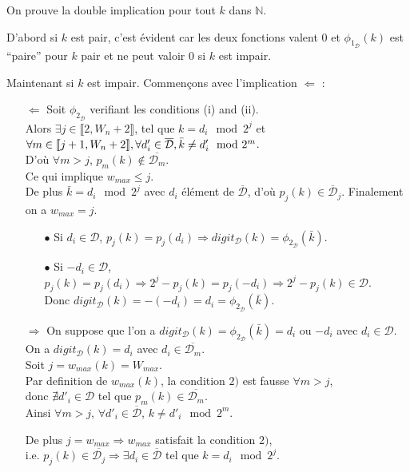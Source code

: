 \documentclass[12pt, a4paper]{memoir}
\begin{document}
\begin{Preuve}
 On prouve la double implication pour tout $k$ dans $\mathbb{N}$.
 
 D'abord si $k$ est pair, c'est évident car les deux fonctions valent $0$ et $\phi_{1_\mathcal{D}}(k)$ est ``paire'' pour $k$ pair et ne peut valoir $0$ si $k$ est impair.
 
 Maintenant si $k$ est impair. Commençons avec l'implication $\Leftarrow$ :
 \begin{itemize}
  \item [$\Leftarrow$] Soit $\phi_{2_\mathcal{D}}$ verifiant les conditions (i) and (ii). \\
  Alors $\exists j \in \llbracket 2,W_n+2 \rrbracket$,
 tel que $k = d_i \mod 2^j$ et $\forall m \in \llbracket j+1,W_n+2 \rrbracket, \\
 \forall d'_i \in \overline{\mathcal{D}}, \bar{k} \neq d'_i \mod 2^m$. \\
 D'où $\forall m > j$, $p_m(k) \notin \overline{\mathcal{D}_m}$. \\
 Ce qui implique $w_{max} \leq j$. \\
 De plus $\bar{k} = d_i \mod 2^j$ avec $d_i$ élément de $\overline{\mathcal{D}}$, d'où $p_j(k) \in \overline{\mathcal{D}}_j$.
 Finalement on a $w_{max} = j$.
  \begin{itemize}
   \item [$\bullet$] Si $d_i \in \mathcal{D}$,  $p_j(k)=p_j(d_i) \Rightarrow digit_{\mathcal{D}}(k) = \phi_{2_\mathcal{D}}(\bar{k})$.
   \item [$\bullet$] Si $-d_i \in \mathcal{D}$, $p_j(k)=p_j(d_i) \Rightarrow 2^j - p_j(k)=p_j(-d_i) \Rightarrow 2^j - p_j(k) \in \mathcal{D}$. \\
   Donc $digit_{\mathcal{D}}(k) =-(-d_i)=d_i=\phi_{2_\mathcal{D}}(\bar{k})$.
  \end{itemize}
  \item [$\Rightarrow$] On suppose que l'on a $digit_{\mathcal{D}}(k) = \phi_{2_\mathcal{D}}(\bar{k}) = d_i$ ou $-d_i$ avec $d_i \in \mathcal{D}$. \\
  On a $digit_{\mathcal{D}}(k) = d_i$ avec $d_i \in \overline{\mathcal{D}_m}$. \\
  Soit $j = w_{max}(k) = W_{max}$. \\
  Par definition de $w_{max}(k)$, la condition $2)$ est fausse $\forall m > j$, \\
  donc $\nexists d'_i \in \mathcal{D}$ tel que $p_m(k) \in \overline{\mathcal{D}_m}$. \\
  Ainsi $\forall m > j$, $\forall d'_i \in \overline{\mathcal{D}}$, $k \neq d'_i \mod 2^m$.
  
  De plus $j=w_{max} \Rightarrow w_{max}$ satisfait la condition $2)$, \\
  i.e. $p_j(k) \in \overline{\mathcal{D}_j} \Rightarrow \exists d_i \in \overline{\mathcal{D}}$ tel que $k = d_i \mod 2^j$.
 \end{itemize}

\end{Preuve}
\end{document}
